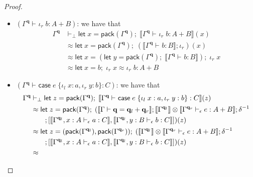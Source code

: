 \documentclass[acmsmall,screen,anonymous,review]{acmart}
\newcommand{\mb}[1]{\ensuremath{\mathbf{#1}}}
\newcommand{\ms}[1]{\ensuremath{\mathsf{#1}}}
\newcommand{\lto}{:}
\newcommand{\linl}[1]{\iota_l\;{#1}}
\newcommand{\linr}[1]{\iota_r\;{#1}}
\newcommand{\letexpr}[3]{\ensuremath{\ms{let}\;#1 = #2;\;#3}}
\newcommand{\caseexpr}[5]{\ms{case}\;#1\;\{\linl{#2} \lto #3, \linr{#4} \lto #5\}}
\newcommand{\qsp}[4]{#1 \vdash #2 = #3 + #4}
\newcommand{\hasty}[4]{#1 \vdash_{#2} #3: {#4}}
\newcommand{\dnt}[1]{\llbracket{#1}\rrbracket}
\begin{document}
\begin{proof}
\begin{itemize}
\begin{align*}
      \letexpr{x}{\ms{pack}(\Gamma^{\mb{q}})}
        {(\dnt{\hasty{\Gamma^{\mb{q}}}{}{a}{A}} ; \iota_l)(x)}
      \\ &\approx
      \letexpr{x}{(\letexpr{y}{\ms{pack}(\Gamma^{\mb{q}})}{\dnt{\hasty{\Gamma^{\mb{q}}}{}{a}{A}}})}
        {\linl{x}} 
      \\ &\approx
      \letexpr{x}{a}{\linl{x}} \approx \linl{a} : A + B
    \end{align*}
    \item $(\hasty{\Gamma^{\mb{q}}}{}{\linr{b}}{A + B})$: we have that
    \begin{align*}
    \Gamma^{\mb{q}} &\vdash_\bot
      \letexpr{x}{\ms{pack}(\Gamma^{\mb{q}})}{\dnt{\hasty{\Gamma^{\mb{q}}}{}{\linr{b}}{A + B}}(x)}
      \\ &\approx 
      \letexpr{x}{\ms{pack}(\Gamma^{\mb{q}})}
        {(\dnt{\hasty{\Gamma^{\mb{q}}}{}{b}{B}} ; \iota_r)(x)}
      \\ &\approx
      \letexpr{x}{(\letexpr{y}{\ms{pack}(\Gamma^{\mb{q}})}{\dnt{\hasty{\Gamma^{\mb{q}}}{}{b}{B}}})}
        {\linr{x}} 
      \\ &\approx
      \letexpr{x}{b}{\linr{x}} \approx \linr{b} : A + B
    \end{align*}
    \item $(\hasty{\Gamma^{\mb{q}}}{}{\caseexpr{e}{x}{a}{y}{b}}{C})$: we have that
    \begin{align*}
    \Gamma^{\mb{q}} &\vdash_\bot
      \letexpr{z}{\ms{pack}(\Gamma^{\mb{q}})}
        {\dnt{\hasty{\Gamma^{\mb{q}}}{}{\caseexpr{e}{x}{a}{y}{b}}{C}}(z)}
      \\ &\approx 
      \letexpr{z}{\ms{pack}(\Gamma^{\mb{q}})}{(\dnt{\qsp{\Gamma}{\mb{q}}{\mb{q}_l}{\mb{q}_r}}
        ; \dnt{\Gamma^{\mb{q}_l}} \otimes \dnt{\hasty{\Gamma^{\mb{q}_r}}{\epsilon}{e}{A + B}}
        ; \delta^{-1} \\ & \qquad
        ; [
          \dnt{\hasty{\Gamma^{\mb{q}_l}, x : A}{\epsilon}{a}{C}},
          \dnt{\hasty{\Gamma^{\mb{q}_l}, y : B}{\epsilon}{b}{C}}
        ])(z)}
      \\ &\approx
      \letexpr{z}{(\ms{pack}(\Gamma^{\mb{q}_l}), \ms{pack}(\Gamma^{\mb{q}_r}))}{(
        \dnt{\Gamma^{\mb{q}_l}} \otimes \dnt{\hasty{\Gamma^{\mb{q}_r}}{\epsilon}{e}{A + B}}
        ; \delta^{-1} \\ & \qquad
        ; [
          \dnt{\hasty{\Gamma^{\mb{q}_l}, x : A}{\epsilon}{a}{C}},
          \dnt{\hasty{\Gamma^{\mb{q}_l}, y : B}{\epsilon}{b}{C}}
        ])(z)}
      \\ &\approx

\end{align*}
\end{itemize}
\end{proof}
\end{document}

